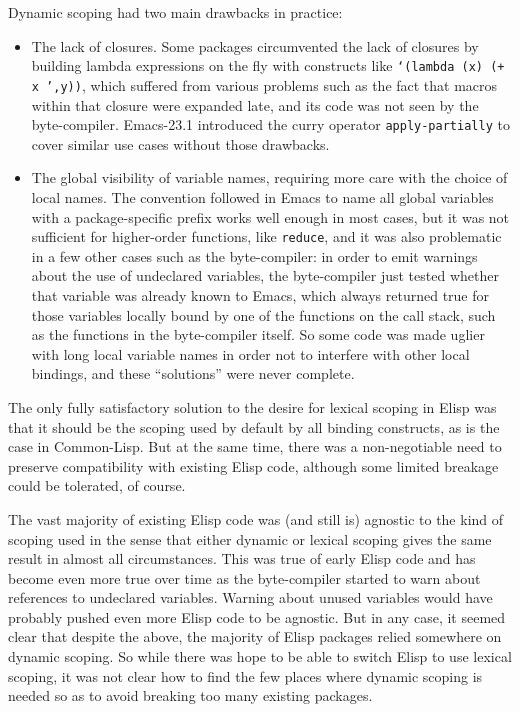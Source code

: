 \documentclass[format=acmsmall, review=false, screen=true]{acmart}
\newcommand \Elisp {Elisp}
\begin{document}
Dynamic scoping had two main drawbacks in practice:
\begin{itemize}
\item The lack of closures.  Some packages circumvented the lack of closures
  by building lambda expressions on the fly with constructs like
  \texttt{`(lambda (x) (+ x ',y))}, which suffered from various problems
  such as the fact that macros within that closure were expanded late, and
  its code was not seen by the byte-compiler.  Emacs-23.1 introduced the
  curry operator \texttt{apply-partially} to cover similar use cases without
  those drawbacks.
\item The global visibility of variable names, requiring more care with the
  choice of local names.  The convention followed in Emacs to name
  all global variables with a package-specific prefix works well enough in
  most cases, but it was not sufficient for higher-order functions, like
  \texttt{reduce}, and it was also problematic in a few other cases such as
  the byte-compiler: in order to emit warnings about the use of undeclared
  variables, the byte-compiler just tested whether that variable was already
  known to Emacs, which always returned true for those variables locally
  bound by one of the functions on the call stack, such as the functions in
  the byte-compiler itself.  So some code was made uglier with long local
  variable names in order not to interfere with other local bindings, and
  these ``solutions'' were never complete.
\end{itemize}

The only fully satisfactory solution to the desire for lexical scoping in
\Elisp{} was that it should be the scoping used by default by all binding
constructs, as is the case in Common-Lisp.  But at the same time, there was
a non-negotiable need to preserve compatibility with existing \Elisp{} code,
although some limited breakage could be tolerated, of course.

The vast majority of existing \Elisp{} code was (and still is) agnostic to
the kind of scoping used in the sense that either dynamic or lexical scoping
gives the same result in almost all circumstances.  This was true of early
\Elisp{} code and has become even more true over time as the byte-compiler
started to warn about references to undeclared variables.  Warning about
unused variables would have probably pushed even more \Elisp{} code to be
agnostic.  But in any case, it seemed clear that despite the above, the
majority of Elisp packages relied somewhere on dynamic scoping.  So while
there was hope to be able to switch \Elisp{} to use lexical scoping, it was
not clear how to find the few places where dynamic scoping is needed so as
to avoid breaking too many existing packages.
\end{document}
